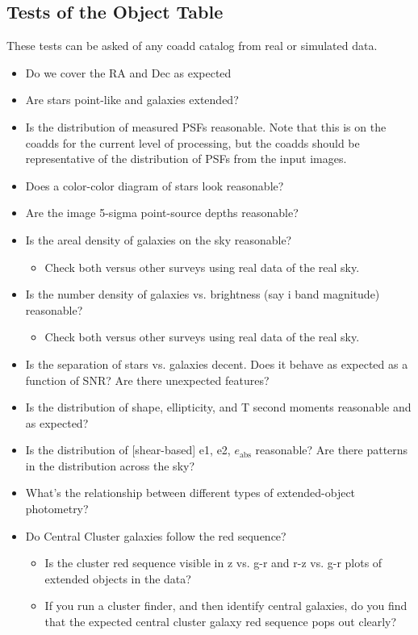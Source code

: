 \documentclass[11pt]{report}
\begin{document}

\subsection{Tests of the Object Table}

These tests can be asked of any coadd catalog from real or simulated data.

\begin{itemize}
  \item Do we cover the RA and Dec as expected
  \item Are stars point-like and galaxies extended?
  \item Is the distribution of measured PSFs reasonable.  Note that this is on the coadds for the current level of processing, but the coadds should be representative of the distribution of PSFs from the input images.
  \item Does a color-color diagram of stars look reasonable?
  \item Are the image 5-sigma point-source depths reasonable?
  \item Is the areal density of galaxies on the sky reasonable?
      \begin{itemize}
          \item Check both versus other surveys using real data of the real sky. 
      \end{itemize}
  \item Is the number density of galaxies vs. brightness (say i band magnitude) reasonable?
      \begin{itemize}
          \item Check both versus other surveys using real data of the real sky. 
      \end{itemize}
  \item Is the separation of stars vs. galaxies decent.  Does it behave as expected as a function of SNR?  Are there unexpected features?
  \item Is the distribution of shape, ellipticity, and T second moments reasonable and as expected?
  \item Is the distribution of [shear-based] e1, e2, $e_\text{abs}$ reasonable?  Are there patterns in the distribution across the sky?
  \item What's the relationship between different types of extended-object photometry?
  \item Do Central Cluster galaxies follow the red sequence?
  \begin{itemize}
      \item Is the cluster red sequence visible in z vs. g-r and r-z vs. g-r plots of extended objects in the data?
      \item If you run a cluster finder, and then identify central galaxies, do you find that the expected central cluster galaxy red sequence pops out clearly?
  \end{itemize}


\end{itemize}
\end{document}
